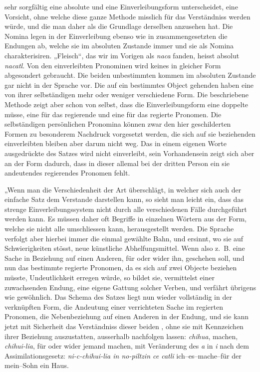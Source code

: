 sehr sorgfältig eine absolute und eine Einverleibungsform unterscheidet, eine Vorsicht, ohne welche diese ganze Methode misslich für das Verständniss werden würde, und die man daher als die Grundlage derselben anzusehen hat. Die Nomina legen in der Einverleibung ebenso wie in zusammengesetzten  die Endungen ab, welche sie im absoluten Zustande immer  und sie als Nomina charakterisiren. „Fleisch“, das wir im Vorigen als \textit{naca} fanden, heisst absolut \textit{nacatl}. Von den einverleibten Pronominen wird keines in gleicher Form abgesondert gebraucht. Die beiden unbestimmten kommen im absoluten Zustande gar nicht in der Sprache vor. Die auf ein bestimmtes Object gehenden haben eine von ihrer selbständigen mehr oder weniger verschiedene Form. Die beschriebene Methode zeigt aber schon von selbst, dass die Einverleibungsform eine doppelte  müsse, eine für das regierende und eine für das regierte Pronomen. Die selbständigen persönlichen Pronomina können zwar den hier geschilderten Formen zu besonderem Nachdruck vorgesetzt werden, die sich auf sie beziehenden einverleibten bleiben aber darum nicht weg. Das in einem eigenen Worte ausgedrückte \largerpage[2] des Satzes wird nicht einverleibt, sein Vorhandensein zeigt sich aber an der Form dadurch, dass in dieser allemal bei der dritten Person ein sie andeutendes regierendes Pronomen fehlt.

\label{sp.356}

„Wenn man die Verschiedenheit der Art überschlägt, in welcher sich auch der einfache Satz dem Verstande darstellen kann, so sieht man leicht ein, dass das strenge Einverleibungssystem nicht durch alle verschiedenen Fälle durchgeführt werden kann. Es müssen daher oft Begriffe in einzelnen Wörtern aus der Form, welche sie nicht alle umschliessen kann, herausgestellt werden. Die Sprache verfolgt aber hierbei immer die einmal gewählte Bahn, und ersinnt, wo sie auf Schwierigkeiten stösst, neue künstliche Abhelfungsmittel. Wenn also z.~B. eine Sache in Beziehung auf einen Anderen, für oder wider ihn, geschehen \label{fp.338} soll, und nun das bestimmte regierte Pronomen, da es sich auf zwei Objecte beziehen müsste, Undeutlichkeit erregen würde, so bildet sie, vermittelst einer zuwachsenden Endung, eine eigene Gattung solcher Verben, und verfährt übrigens wie  gewöhnlich. Das Schema des Satzes liegt nun wieder vollständig in der verknüpften Form, die Andeutung einer verrichteten Sache im regierten Pronomen, die Nebenbeziehung auf einen Anderen in der Endung, und sie kann jetzt mit Sicherheit das Verständniss dieser beiden , ohne sie mit Kennzeichen ihrer Beziehung auszustatten, ausserhalb nachfolgen lassen: \textit{chihua}, machen, \textit{chihui-lia}, für oder wider jemand machen, mit Veränderung des \textit{a} in \textit{i} nach dem Assimilationsgesetz: \textit{ni-c-chihui-lia in no-piltzin ce catli} ich–es–mache–für der mein–Sohn ein Haus.

